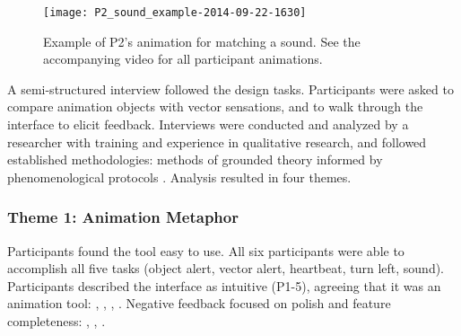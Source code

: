 %
%
\begin{figure}[htb] %
   \centering
	   	\texttt{[image: P2\_sound\_example-2014-09-22-1630]} 

	\caption{Example of P2's animation for matching a sound. See the accompanying video for all participant animations.}
	\label{fig:animation:example:p2}
\end{figure}




A semi-structured interview followed the design tasks.
Participants were asked to compare animation objects with vector sensations, and to walk through the interface to elicit feedback.
%
%
Interviews were conducted and analyzed by a researcher with training and experience in qualitative research, and followed established methodologies:
methods of grounded theory  \cite{Corbin2008} informed by phenomenological protocols \cite{Moustakas1994}.
Analysis resulted in four themes.

\subsubsection{Theme 1: Animation Metaphor}
Participants found the tool easy to use.
All six participants were able to accomplish all five tasks (object alert, vector alert, heartbeat, turn left, sound).
Participants described the interface as intuitive (P1-5), agreeing that it was an animation tool: , , , .
Negative feedback focused on polish and feature completeness:
, , .


